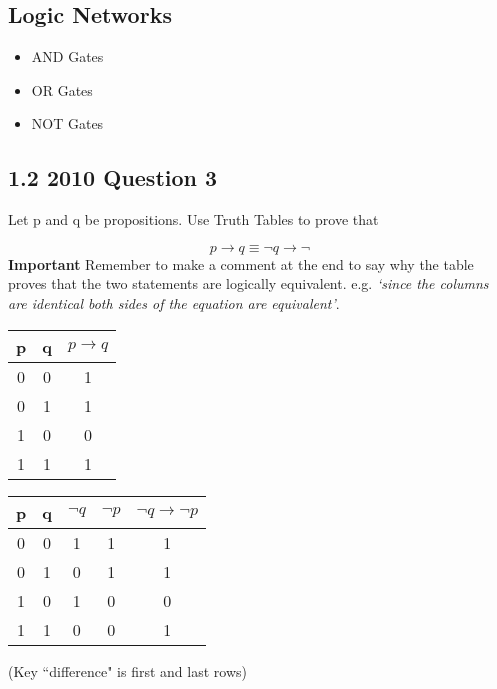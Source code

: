 \documentclass[12pt]{article}
\begin{document}
\subsection*{Logic Networks}
\begin{itemize}
\item AND Gates
\item OR Gates
\item NOT Gates
\end{itemize}

\newpage

\subsection*{1.2 2010 Question 3}

Let p and q be propositions. Use Truth Tables to prove that

\[ p \rightarrow q \equiv \neg q \rightarrow \neg\]
\textbf{Important} Remember to make a comment at the end to say why the table proves that the two statements are logically equivalent. e.g. \emph{‘since the columns are identical both sides of the equation are equivalent’}.
{ 
\begin{tabular}{|c|c||c|}
\hline  p&  q& $p \rightarrow q$ \\ 
\hline  0&  0&  1\\ 
\hline  0&  1&  1\\ 
\hline  1&  0&  0\\ 
\hline  1&  1&  1\\ 
\hline 
\end{tabular} \hspace{0.5cm} \begin{tabular}{|c|c||c|c|c|}
\hline  p&  q& $\neg q$ & $\neg p$ & $\neg q \rightarrow \neg p$ \\ 
\hline  0&  0& 1& 1& 1\\ 
\hline  0&  1& 0& 1& 1\\ 
\hline  1&  0& 1& 0& 0\\ 
\hline  1&  1& 0& 0& 1\\ 
\hline 
\end{tabular}
} 
(Key ``difference" is first and last rows)
\end{document}
